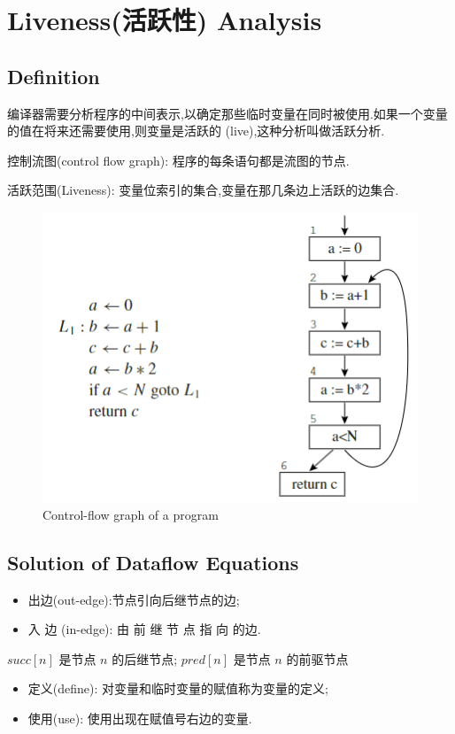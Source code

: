 \section{Liveness(活跃性) Analysis}
\subsection{Definition}

编译器需要分析程序的中间表示,以确定那些临时变量在同时被使用.如果一个变量的值在将来还需要使用,则变量是活跃的 (live),这种分析叫做活跃分析.

控制流图(control flow graph): 程序的每条语句都是流图的节点.


活跃范围(Liveness): 变量位索引的集合,变量在那几条边上活跃的边集合.

\begin{figure}[H]
    \centering
    \includegraphics[width=0.6\linewidth]{pic/CP10/Control-flow graph of a program}
    \caption{Control-flow graph of a program}
\end{figure}


\subsection{Solution of Dataflow Equations}
\begin{itemize}
    \item 出边(out-edge):节点引向后继节点的边; 
    \item 入 边 (in-edge): 由 前 继 节 点 指 向 的边.
\end{itemize}
$succ[n]$ 是节点 $n$ 的后继节点; $pred[n]$ 是节点 $n$ 的前驱节点

\begin{itemize}
    \item 定义(define): 对变量和临时变量的赋值称为变量的定义;
    \item 使用(use): 使用出现在赋值号右边的变量.
\end{itemize}

